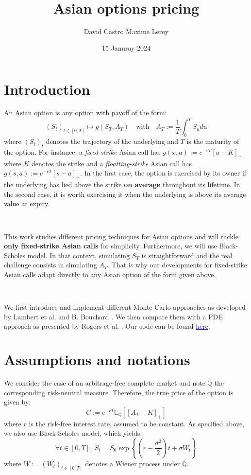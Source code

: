 \documentclass{article}
\title{Asian options pricing}
\author{David Castro \qquad Maxime Leroy}
\date{15 Januray 2024}
\begin{document}
\maketitle

\section*{Introduction}

An Asian option is any option with payoff of the form:
\[
	\left( S_t \right)_{t \in [0, T]} \mapsto g \left( S_T, A_T \right) \quad \text{with} \quad A_T := \frac{1}{T} \int_0^T S_u du
\]
where $\left( S_t \right)_t$ denotes the trajectory of the underlying and $T$ is the maturity of the option.
For instance, a \textit{fixed-strike} Asian call has $g(x, a) := e^{-rT} \left[ a - K \right]_+$ where $K$ denotes the strike
and a \textit{floatting-strike} Asian call has $g(s, a) := e^{-rT}  \left[ s - a \right]_+$.
In the first case, the option is exercised by its owner
if the underlying has lied above the strike \textbf{on average} throughout its lifetime. In the second case,
it is worth exercising it when the underlying is above its average value at expiry.

\

This work studies different pricing techniques for Asian options and will tackle \textbf{only fixed-strike Asian calls}
for simplicity. Furthermore, we will use Black-Scholes model. In that context, simulating $S_T$ is straightforward
and the real challenge consists in simulating $A_T$. That is why our developments for fixed-strike Asian calls
adapt directly to any Asian option of the form given above.

\

We first introduce and implement different Monte-Carlo approaches as developed by Lambert et al. \cite{main}
and B. Bouchard \cite{Bouchard}. We then compare them with a PDE approach as presented by
Rogers et al. \cite{Rogers}.
Our code can be found \href{https://github.com/20castro/Projet_MC}{\textcolor{blue}{\underline{here}}}.

\section*{Assumptions and notations}

We consider the case of an arbitrage-free complete market and note $\mathbb Q$ the corresponding
risk-neutral measure. Therefore, the true price of the option is given by:
\[
	C := e^{-rT} \mathbb E_{\mathbb Q} \left[ [ A_T - K ]_+ \right]
\]
where $r$ is the risk-free interest rate, assumed to be constant.
As specified above, we also use Black-Scholes model, which yields:
\begin{equation}
	\forall t \in [0, T], \ S_t = S_0 \exp \left\{ \left( r - \frac{\sigma^2}{2} \right) t + \sigma W_t \right\}
	\tag{BS}
\end{equation}
where $W := (W_t)_{t \in [0, T]}$ denotes a Wiener process under $\mathbb Q$.
\end{document}
